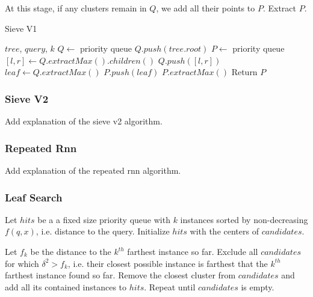 At this stage, if any clusters remain in $Q$, we add all their points to $P$. 
Extract $P$. 

\begin{algorithm} %
    \caption{Sieve V1} %
    \label{alg:sieve_v1} %
    \begin{algorithmic}[2] %
        \REQUIRE $tree$, $query$, $k$
        \STATE $Q \leftarrow$ priority queue
        \STATE $Q.push(tree.root)$
        \STATE $P \leftarrow$ priority queue
                \STATE $[l, r] \leftarrow Q.extractMax().children()$
                \STATE $Q.push([l, r])$
            \ENDWHILE
            \STATE $leaf \leftarrow Q.extractMax()$
            \STATE $P.push(leaf)$
                \STATE $P.extractMax()$
            \ENDWHILE
        \ENDWHILE
        \STATE Return $P$
    \end{algorithmic}
    \end{algorithm}

\subsubsection{Sieve V2}
\label{subsubsec:methods:knn-search:sieve-v2}
Add explanation of the sieve v2 algorithm.

\subsubsection{Repeated Rnn}
\label{subsubsec:methods:knn-search:repeated-rnn}
Add explanation of the repeated rnn algorithm.

\subsubsection{Leaf Search}
\label{subsubsec:methods:knn-search:leaf-search}

Let $hits$ be a a fixed size priority queue with $k$ instances sorted by non-decreasing $f(q, x)$, i.e. distance to the query.
Initialize $hits$ with the centers of $candidates$.

Let $f_k$ be the distance to the $k^{th}$ farthest instance so far.
Exclude all $candidates$ for which $\delta^2 > f_k$, i.e. their closest possible instance is farthest that the $k^{th}$ farthest instance found so far.
Remove the closest cluster from $candidates$ and add all its contained instances to $hits$.
Repeat until $candidates$ is empty.

